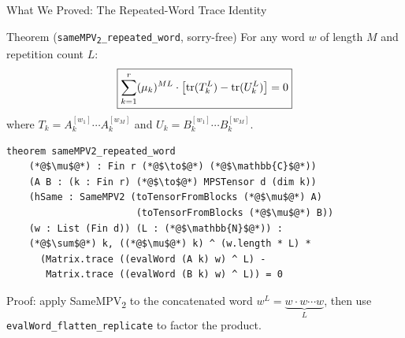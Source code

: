 \documentclass[aspectratio=169,10pt]{beamer}
\begin{document}
\begin{frame}[fragile]{What We Proved: The Repeated-Word Trace Identity}
\vspace{-0.5em}

\begin{block}{Theorem (\texttt{sameMPV\textsubscript{2}\_repeated\_word}, sorry-free)}
For any word $w$ of length $M$ and repetition count $L$:
\[
  \boxed{ 
  \sum_{k=1}^r (\mu_k)^{ML} \cdot
  \left[\mathrm{tr}(T_k^L) - \mathrm{tr}(U_k^L)\right] = 0
  }
\]
where $T_k = A_k^{[w_1]} \cdots A_k^{[w_M]}$ and
$U_k = B_k^{[w_1]} \cdots B_k^{[w_M]}$.
\end{block}

\vspace{-0.3em}
\begin{lstlisting}
theorem sameMPV2_repeated_word
    (*@$\mu$@*) : Fin r (*@$\to$@*) (*@$\mathbb{C}$@*))
    (A B : (k : Fin r) (*@$\to$@*) MPSTensor d (dim k))
    (hSame : SameMPV2 (toTensorFromBlocks (*@$\mu$@*) A)
                       (toTensorFromBlocks (*@$\mu$@*) B))
    (w : List (Fin d)) (L : (*@$\mathbb{N}$@*)) :
    (*@$\sum$@*) k, ((*@$\mu$@*) k) ^ (w.length * L) *
      (Matrix.trace ((evalWord (A k) w) ^ L) -
       Matrix.trace ((evalWord (B k) w) ^ L)) = 0
\end{lstlisting}

\vspace{0.2em}
\textcolor{dimwhite}{\footnotesize%
Proof: apply SameMPV\textsubscript{2} to the concatenated word $w^L = \underbrace{w \cdot w \cdots w}_{L}$,
then use \texttt{evalWord\_flatten\_replicate} to factor the product.}
\end{frame}
\end{document}
